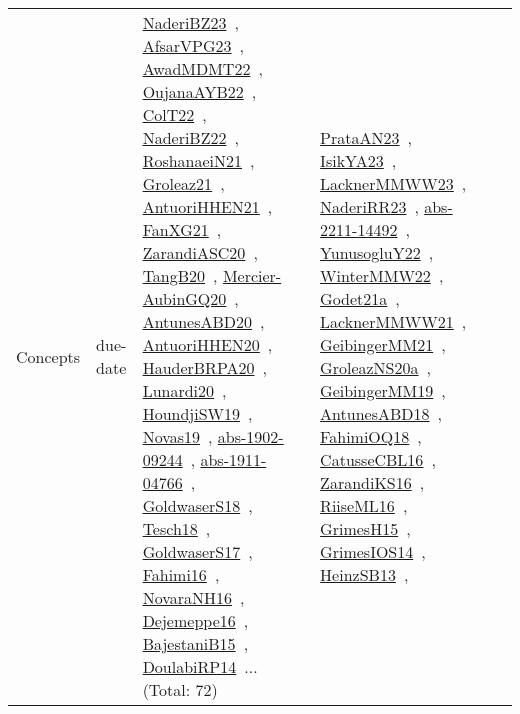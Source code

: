 {\begin{longtable}{lp{3cm}>{\raggedright\arraybackslash}p{6cm}>{\raggedright\arraybackslash}p{6cm}>{\raggedright\arraybackslash}p{8cm}}
Concepts & due-date & \href{../works/NaderiBZ23.pdf}{NaderiBZ23}~\cite{NaderiBZ23}, \href{../works/AfsarVPG23.pdf}{AfsarVPG23}~\cite{AfsarVPG23}, \href{../works/AwadMDMT22.pdf}{AwadMDMT22}~\cite{AwadMDMT22}, \href{../works/OujanaAYB22.pdf}{OujanaAYB22}~\cite{OujanaAYB22}, \href{../works/ColT22.pdf}{ColT22}~\cite{ColT22}, \href{../works/NaderiBZ22.pdf}{NaderiBZ22}~\cite{NaderiBZ22}, \href{../works/RoshanaeiN21.pdf}{RoshanaeiN21}~\cite{RoshanaeiN21}, \href{../works/Groleaz21.pdf}{Groleaz21}~\cite{Groleaz21}, \href{../works/AntuoriHHEN21.pdf}{AntuoriHHEN21}~\cite{AntuoriHHEN21}, \href{../works/FanXG21.pdf}{FanXG21}~\cite{FanXG21}, \href{../works/ZarandiASC20.pdf}{ZarandiASC20}~\cite{ZarandiASC20}, \href{../works/TangB20.pdf}{TangB20}~\cite{TangB20}, \href{../works/Mercier-AubinGQ20.pdf}{Mercier-AubinGQ20}~\cite{Mercier-AubinGQ20}, \href{../works/AntunesABD20.pdf}{AntunesABD20}~\cite{AntunesABD20}, \href{../works/AntuoriHHEN20.pdf}{AntuoriHHEN20}~\cite{AntuoriHHEN20}, \href{../works/HauderBRPA20.pdf}{HauderBRPA20}~\cite{HauderBRPA20}, \href{../works/Lunardi20.pdf}{Lunardi20}~\cite{Lunardi20}, \href{../works/HoundjiSW19.pdf}{HoundjiSW19}~\cite{HoundjiSW19}, \href{../works/Novas19.pdf}{Novas19}~\cite{Novas19}, \href{../works/abs-1902-09244.pdf}{abs-1902-09244}~\cite{abs-1902-09244}, \href{../works/abs-1911-04766.pdf}{abs-1911-04766}~\cite{abs-1911-04766}, \href{../works/GoldwaserS18.pdf}{GoldwaserS18}~\cite{GoldwaserS18}, \href{../works/Tesch18.pdf}{Tesch18}~\cite{Tesch18}, \href{../works/GoldwaserS17.pdf}{GoldwaserS17}~\cite{GoldwaserS17}, \href{../works/Fahimi16.pdf}{Fahimi16}~\cite{Fahimi16}, \href{../works/NovaraNH16.pdf}{NovaraNH16}~\cite{NovaraNH16}, \href{../works/Dejemeppe16.pdf}{Dejemeppe16}~\cite{Dejemeppe16}, \href{../works/BajestaniB15.pdf}{BajestaniB15}~\cite{BajestaniB15}, \href{../works/DoulabiRP14.pdf}{DoulabiRP14}~\cite{DoulabiRP14}... (Total: 72) & \href{../works/PrataAN23.pdf}{PrataAN23}~\cite{PrataAN23}, \href{../works/IsikYA23.pdf}{IsikYA23}~\cite{IsikYA23}, \href{../works/LacknerMMWW23.pdf}{LacknerMMWW23}~\cite{LacknerMMWW23}, \href{../works/NaderiRR23.pdf}{NaderiRR23}~\cite{NaderiRR23}, \href{../works/abs-2211-14492.pdf}{abs-2211-14492}~\cite{abs-2211-14492}, \href{../works/YunusogluY22.pdf}{YunusogluY22}~\cite{YunusogluY22}, \href{../works/WinterMMW22.pdf}{WinterMMW22}~\cite{WinterMMW22}, \href{../works/Godet21a.pdf}{Godet21a}~\cite{Godet21a}, \href{../works/LacknerMMWW21.pdf}{LacknerMMWW21}~\cite{LacknerMMWW21}, \href{../works/GeibingerMM21.pdf}{GeibingerMM21}~\cite{GeibingerMM21}, \href{../works/GroleazNS20a.pdf}{GroleazNS20a}~\cite{GroleazNS20a}, \href{../works/GeibingerMM19.pdf}{GeibingerMM19}~\cite{GeibingerMM19}, \href{../works/AntunesABD18.pdf}{AntunesABD18}~\cite{AntunesABD18}, \href{../works/FahimiOQ18.pdf}{FahimiOQ18}~\cite{FahimiOQ18}, \href{../works/CatusseCBL16.pdf}{CatusseCBL16}~\cite{CatusseCBL16}, \href{../works/ZarandiKS16.pdf}{ZarandiKS16}~\cite{ZarandiKS16}, \href{../works/RiiseML16.pdf}{RiiseML16}~\cite{RiiseML16}, \href{../works/GrimesH15.pdf}{GrimesH15}~\cite{GrimesH15}, \href{../works/GrimesIOS14.pdf}{GrimesIOS14}~\cite{GrimesIOS14}, \href{../works/HeinzSB13.pdf}{HeinzSB13}~\cite{HeinzSB13}, 
\end{longtable}}

